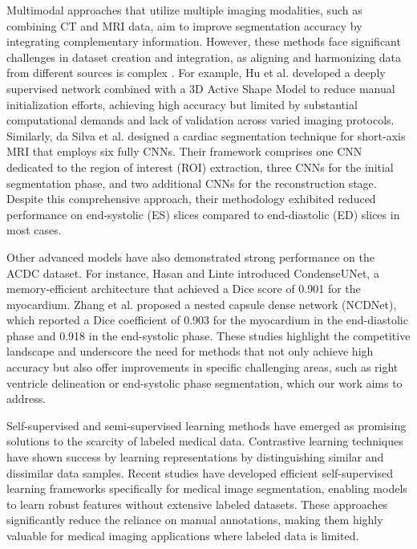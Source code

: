 \documentclass[fleqn,10pt]{wlscirep}
\begin{document}
Multimodal approaches that utilize multiple imaging modalities, such as combining CT and MRI data, aim to improve segmentation accuracy by integrating complementary information. However, these methods face significant challenges in dataset creation and integration, as aligning and harmonizing data from different sources is complex \cite{Pandey:2023,Azam:2022}. For example, Hu et al. \cite{Hu:2023} developed a deeply supervised network combined with a 3D Active Shape Model to reduce manual initialization efforts, achieving high accuracy but limited by substantial computational demands and lack of validation across varied imaging protocols. Similarly, da Silva et al. \cite{daSilva:2024} designed a cardiac segmentation technique for short-axis MRI that employs six fully CNNs. Their framework comprises one CNN dedicated to the region of interest (ROI) extraction, three CNNs for the initial segmentation phase, and two additional CNNs for the reconstruction stage. Despite this comprehensive approach, their methodology exhibited reduced performance on end-systolic (ES) slices compared to end-diastolic (ED) slices in most cases.

Other advanced models have also demonstrated strong performance on the ACDC dataset. For instance, Hasan and Linte \cite{Hasan:2020} introduced CondenseUNet, a memory-efficient architecture that achieved a Dice score of 0.901 for the myocardium. Zhang et al. \cite{Zhang:2022} proposed a nested capsule dense network (NCDNet), which reported a Dice coefficient of 0.903 for the myocardium in the end-diastolic phase and 0.918 in the end-systolic phase. These studies highlight the competitive landscape and underscore the need for methods that not only achieve high accuracy but also offer improvements in specific challenging areas, such as right ventricle delineation or end-systolic phase segmentation, which our work aims to address.

Self-supervised and semi-supervised learning methods have emerged as promising solutions to the scarcity of labeled medical data. Contrastive learning techniques \cite{Tian:2020,Chen:2020} have shown success by learning representations by distinguishing similar and dissimilar data samples. Recent studies \cite{Liu:2024,Felfeliyan:2023} have developed efficient self-supervised learning frameworks specifically for medical image segmentation, enabling models to learn robust features without extensive labeled datasets. These approaches significantly reduce the reliance on manual annotations, making them highly valuable for medical imaging applications where labeled data is limited.
\end{document}
